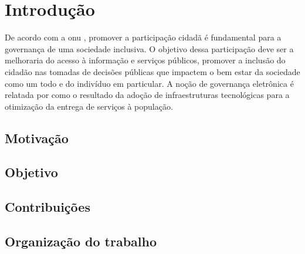 \chapter[Introdução]{Introdução}
\par
De acordo com a \acrlong{onu} \cite{onu2018}, promover a participação cidadã é fundamental para a governança de uma sociedade inclusiva.
O objetivo dessa participação deve ser a melhoraria do acesso à informação e serviços públicos,
promover a inclusão do cidadão nas tomadas de decisões públicas que impactem
o bem estar da sociedade como um todo e do indivíduo em particular. 
A noção de governança eletrônica é relatada por \cite{reddick2012public} como o resultado da adoção de infraestruturas 
tecnológicas para a otimização da entrega de serviços à população.




\section{Motivação}

\section{Objetivo}

\section{Contribuições}

\section{Organização do trabalho}